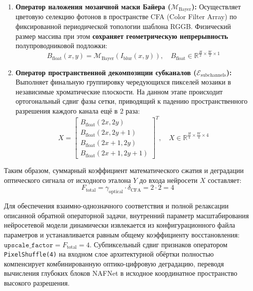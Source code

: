 \documentclass[12pt,a4paper]{article}
\begin{document}
\begin{enumerate}
    \item \textbf{Оператор наложения мозаичной маски Байера ($\mathcal{M}_{\text{Bayer}}$):} Осуществляет цветовую селекцию фотонов в пространстве CFA (Color Filter Array) по фиксированной периодической топологии шаблона RGGB. Физический размер массива при этом \textbf{сохраняет геометрическую непрерывность} полупроводниковой подложки:
    \begin{equation}
    B_{\text{float}}(x,y) = \mathcal{M}_{\text{Bayer}}\left(I_{\text{blur}}(x,y)\right), \quad B_{\text{float}} \in \mathbb{R}^{\frac{H}{2} \times \frac{W}{2} \times 1}
    \end{equation}
    
    \item \textbf{Оператор пространственной декомпозиции субканалов ($\mathcal{E}_{\text{subchannels}}$):} Выполняет финальную группировку чередующихся пикселей мозаики в независимые хроматические плоскости. На данном этапе происходит ортогональный сдвиг фазы сетки, приводящий к падению пространственного разрешения каждого канала ещё в $2$ раза:
    \begin{equation}
    X = \begin{bmatrix} 
    B_{\text{float}}(2x, 2y) \\ 
    B_{\text{float}}(2x, 2y+1) \\ 
    B_{\text{float}}(2x+1, 2y) \\ 
    B_{\text{float}}(2x+1, 2y+1) 
    \end{bmatrix}^T, \quad X \in \mathbb{R}^{\frac{H}{4} \times \frac{W}{4} \times 4}
    \end{equation}
\end{enumerate}

Таким образом, суммарный коэффициент математического сжатия и деградации оптического сигнала от исходного эталона $Y$ до входа нейросети $X$ составляет:
\begin{equation}
F_{\text{total}} = \gamma_{\text{optical}} \cdot \delta_{\text{CFA}} = 2 \cdot 2 = 4
\end{equation}

Для обеспечения взаимно-однозначного соответствия и полной релаксации описанной обратной операторной задачи, внутренний параметр масштабирования нейросетевой модели динамически извлекается из конфигурационного файла параметров и устанавливается равным общему коэффициенту восстановления: $\texttt{upscale\_factor} = F_{\text{total}} = 4$. Субпиксельный сдвиг признаков оператором \texttt{PixelShuffle(4)} на входном слое архитектурной обёртки полностью компенсирует комбинированную оптико-цифровую деградацию, переводя вычисления глубоких блоков NAFNet в исходное координатное пространство высокого разрешения.
\end{document}
